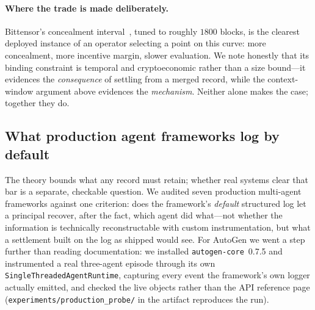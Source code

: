 \paragraph{Where the trade is made deliberately.}
Bittensor's concealment interval~\cite{bittensorcommitreveal}, tuned to roughly $1800$ blocks, is the clearest
deployed instance of an operator selecting a point on this curve: more
concealment, more incentive margin, slower evaluation. We note honestly that its
binding constraint is temporal and cryptoeconomic rather than a size bound---it
evidences the \emph{consequence} of settling from a merged record, while the
context-window argument above evidences the \emph{mechanism}. Neither alone
makes the case; together they do.

\subsection{What production agent frameworks log by default}
\label{sec:framework-audit}

The theory bounds what any record must retain; whether real systems clear that
bar is a separate, checkable question. We audited seven production
multi-agent frameworks against one criterion: does the framework's
\emph{default} structured log let a principal recover, after the fact, which
agent did what---not whether the information is technically reconstructable
with custom instrumentation, but what a settlement built on the log as shipped
would see. For AutoGen we went a step further than reading documentation: we
installed \texttt{autogen-core}~0.7.5 and instrumented a real three-agent
episode through its own \texttt{SingleThreadedAgentRuntime}, capturing every
event the framework's own logger actually emitted, and checked the live
objects rather than the API reference page (\texttt{experiments/production\_probe/}
in the artifact reproduces the run).

